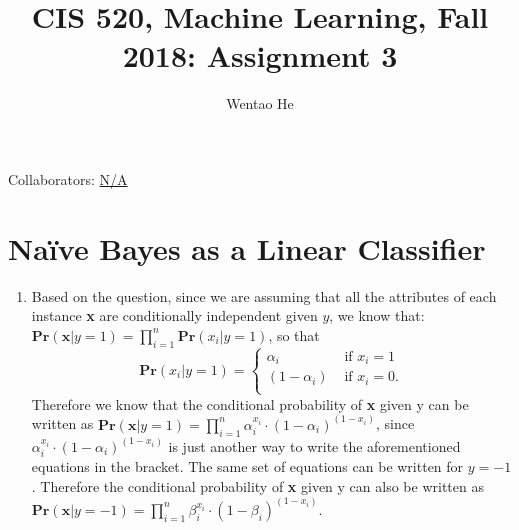 \documentclass[english]{article}
\title{CIS 520, Machine Learning, Fall 2018: Assignment 3}
\author{Wentao He}
\begin{document}
\maketitle

{\normalsize \noindent Collaborators: \underline{N/A}} \\

\section {Na\"ive Bayes as a Linear Classifier}
\begin{enumerate}
  
  \item 
  Based on the question, since we are assuming that all the attributes of each instance \textbf{x} are conditionally independent given $y$, we know that:$\mathbf{Pr}(\mathbf{x}|y=1)=\prod\limits_{i=1}^n\mathbf{Pr}(x_i|y=1)$, so that 
  \[
  \mathbf{Pr}(x_i|y=1)=\begin{cases}
               \alpha_i &\text{ if } x_i=1\\
               (1-\alpha_i) &\text{ if } x_i=0.\\
            \end{cases}
\]
  Therefore we know that the conditional probability of \textbf{x} given y can be written as $\mathbf{Pr}(\mathbf{x}|y=1)=\prod\limits_{i=1}^n \alpha_i^{x_i}\cdot(1-\alpha_i)^{(1-x_i)}$, since $\alpha_i^{x_i}\cdot(1-\alpha_i)^{(1-x_i)}$ is just another way to write the aforementioned equations in the bracket. The same set of equations can be written for $y=-1$. Therefore the conditional probability of \textbf{x} given y can also be written as $\mathbf{Pr}(\mathbf{x}|y=-1)=\prod\limits_{i=1}^n \beta_i^{x_i}\cdot(1-\beta_i)^{(1-x_i)}$.\\
  

\end{enumerate}
\end{document}
